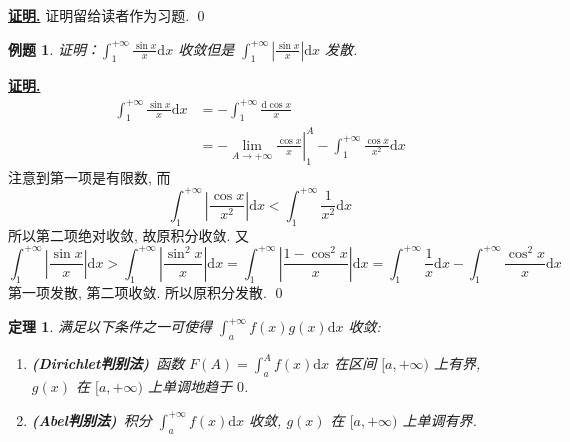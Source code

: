 \documentclass[10pt,a4paper]{book}
\theoremstyle{thmstyle} %
\newtheorem{theorem}{定理}[chapter]
\theoremstyle{defstyle} %
\theoremstyle{prostyle} %
\newtheorem{example}{例题}[chapter]
\renewenvironment{proof}[1][证明]{\par{\kaishu \uline{\textbf{#1.}}} \;\fangsong}{\qed\par}
\begin{document}
	\begin{proof}
		证明留给读者作为习题.
	\end{proof}
	\begin{example}
		证明：$\displaystyle\int_1^{+\infty}\frac{\sin x}{x}\mathrm{d}x$ 收敛但是 $\displaystyle\int_1^{+\infty}{\left|\frac{\sin x}{x}\right|}\mathrm{d}x$ 发散.
	\end{example}
	\begin{proof}
		\begin{align*}
			 \int_1^{+\infty}{\frac{\sin x}{x}}\mathrm{d}x&=-\int_1^{+\infty}{\frac{\mathrm{d}\cos x}{x}}\\
			 	&=\left. -\lim_{A\rightarrow +\infty} \frac{\cos x}{x} \right|_{1}^{A}-\int_1^{+\infty}{\frac{\cos x}{x^2}\mathrm{d}x}
		\end{align*}
		注意到第一项是有限数, 而
		$$
		\int_{1}^{+\infty}\left|\frac{\cos x}{x^2}\right|\mathrm{d}x<\int_{1}^{+\infty}\frac{1}{x^2}\mathrm{d}x
		$$
		所以第二项绝对收敛, 故原积分收敛.
		又
		$$
		\int_{1}^{+\infty}\left|\frac{\sin x}{x}\right|\mathrm{d}x>\int_{1}^{+\infty}\left|\frac{\sin^2 x}{x}\right|\mathrm{d}x=\int_{1}^{+\infty}\left|\frac{1-\cos^2x}{x}\right|\mathrm{d}x=\int_{1}^{+\infty}
		\frac{1}{x}\mathrm{d}x-\int_{1}^{+\infty}\frac{\cos^2x}{x}\mathrm{d}x
		$$
		第一项发散, 第二项收敛. 所以原积分发散.
	\end{proof}
	\begin{theorem}
		满足以下条件之一可使得 $\displaystyle\int_{a}^{+\infty}f(x)g(x)\mathrm{d}x$ 收敛:
		\begin{enumerate}
			\item \textbf{(\thinspace Dirichlet\thinspace 判别法)}\ 函数 $F(A)=\displaystyle\int_{a}^{A}f(x)\mathrm{d}x$ 在区间 $[a,+\infty)$ 上有界, $g(x)$ 在 $[a,+\infty)$ 上单调地趋于 $0$.
			\item \textbf{(\thinspace Abel\thinspace 判别法)}\ 积分 $\displaystyle\int_{a}^{+\infty}f(x)\mathrm{d}x$ 收敛, $g(x)$ 在 $[a,+\infty)$ 上单调有界.
		\end{enumerate}
	\end{theorem}
\end{document}
